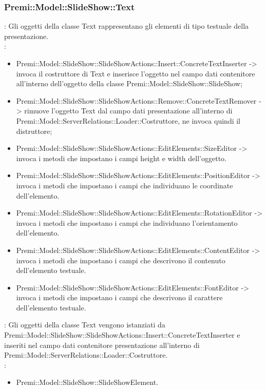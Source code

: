 {     \subsubsection{Premi::Model::SlideShow::Text}{
				\textbf{\tipo}: Gli oggetti della classe Text rappresentano gli elementi di tipo testuale della presentazione.\\
				\textbf{\relaz}: 
				\begin{itemize}
					\item Premi::Model::SlideShow::SlideShowActions::Insert::ConcreteTextInserter -> invoca il costruttore di Text e inserisce l’oggetto nel campo dati contenitore all’interno dell’oggetto della classe Premi::Model::SlideShow::SlideShow;
                    \item Premi::Model::SlideShow::SlideShowActions::Remove::ConcreteTextRemover -> rimuove l’oggetto Text dal campo dati presentazione all’interno di Premi::Model::ServerRelations::Loader::Costruttore, ne invoca quindi il distruttore;
                    \item Premi::Model::SlideShow::SlideShowActions::EditElements::SizeEditor -> invoca i metodi che impostano i campi height e width dell'oggetto.
                    \item Premi::Model::SlideShow::SlideShowActions::EditElements::PositionEditor -> invoca i metodi che impostano i campi che individuano le coordinate dell'elemento.
                    \item Premi::Model::SlideShow::SlideShowActions::EditElements::RotationEditor -> invoca i metodi che impostano i campi che individuano l'orientamento dell'elemento.
                    \item Premi::Model::SlideShow::SlideShowActions::EditElements::ContentEditor -> invoca i metodi che impostano i campi che descrivono il contenuto dell'elemento testuale.
                    \item Premi::Model::SlideShow::SlideShowActions::EditElements::FontEditor -> invoca i metodi che impostano i campi che descrivono il carattere dell'elemento testuale.
				\end{itemize}	
                \textbf{\interfacce}: Gli oggetti della classe Text vengono istanziati da Premi::Model::SlideShow::SlideShowActions::Insert::ConcreteTextInserter e inseriti nel campo dati contenitore presentazione all’interno di Premi::Model::ServerRelations::Loader::Costruttore.\\
                \textbf{\base}: 
                    \begin{itemize}
                    \item Premi::Model::SlideShow::SlideShowElement.
                    \end{itemize}
                    }
}
